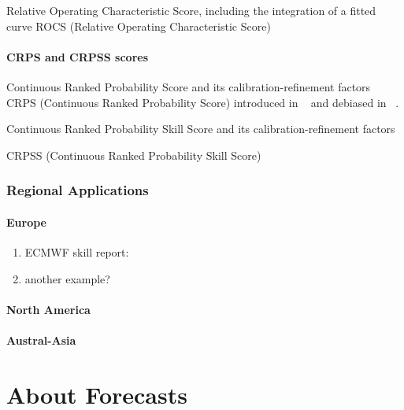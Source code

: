 \documentclass[logos,parttoc,morelanguage=french,morelanguage=italian]{orsay-memoire}
\begin{document}
Relative Operating Characteristic Score, including the integration of a fitted curve
ROCS (Relative Operating Characteristic Score)



\subsection{CRPS and CRPSS scores}
Continuous Ranked Probability Score and its calibration-refinement factors
CRPS (Continuous Ranked Probability Score) introduced in ~\cite{hersbach2000decomposition} and debiased in ~\cite{ferro2008effect}.

Continuous Ranked Probability Skill Score and its calibration-refinement factors

CRPSS (Continuous Ranked Probability Skill Score)

\section{Regional Applications}

\subsection{Europe}
	\begin{enumerate}
       \item ECMWF skill report: 
       \item another example?
     \end{enumerate}


\subsection{North America}

\subsection{Austral-Asia}

\part{About Forecasts}
\end{document}
